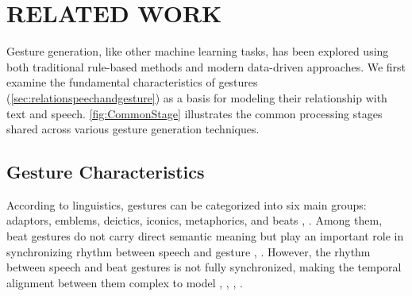 %
%
%
%
%
%

\section{RELATED WORK}
\label{sec:related_work}


Gesture generation, like other machine learning tasks, has been explored using both traditional rule-based methods and modern data-driven approaches. We first examine the fundamental characteristics of gestures (\autoref{sec:relationspeechandgesture}) as a basis for modeling their relationship with text and speech. \autoref{fig:CommonStage} illustrates the common processing stages shared across various gesture generation techniques.


\subsection{Gesture Characteristics}
\label{sec:relationspeechandgesture}

According to linguistics, gestures can be categorized into six main groups: adaptors, emblems, deictics, iconics, metaphorics, and beats \citep{ekman1969repertoire}, \citep{sebeok2011advances}. Among them, beat gestures do not carry direct semantic meaning but play an important role in synchronizing rhythm between speech and gesture \citep{kipp2005gesture}, \citep{sebeok2011advances}. However, the rhythm between speech and beat gestures is not fully synchronized, making the temporal alignment between them complex to model \citep{mcclave1994gestural}, \citep{bhattacharya2021speech2affectivegestures}, \citep{kucherenko2020gesticulator}, \citep{yoon2020speech}.

